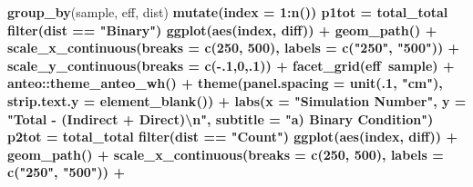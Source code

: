 \documentclass[]{DissertateUSU}
\newenvironment{Shaded}{\begin{snugshade}}{\end{snugshade}}
\newcommand{\KeywordTok}[1]{\textcolor[rgb]{0.13,0.29,0.53}{\textbf{#1}}}
\newcommand{\DataTypeTok}[1]{\textcolor[rgb]{0.13,0.29,0.53}{#1}}
\newcommand{\DecValTok}[1]{\textcolor[rgb]{0.00,0.00,0.81}{#1}}
\newcommand{\CharTok}[1]{\textcolor[rgb]{0.31,0.60,0.02}{#1}}
\newcommand{\StringTok}[1]{\textcolor[rgb]{0.31,0.60,0.02}{#1}}
\newcommand{\OperatorTok}[1]{\textcolor[rgb]{0.81,0.36,0.00}{\textbf{#1}}}
\newcommand{\NormalTok}[1]{#1}
\begin{document}
\begin{Shaded}
\begin{Highlighting}[]
{{{{{{{{{{\StringTok{  }\KeywordTok{group_by}\NormalTok{(sample, eff, dist) }\OperatorTok{%>%}
\StringTok{  }\KeywordTok{mutate}\NormalTok{(}\DataTypeTok{index =} \DecValTok{1}\OperatorTok{:}\KeywordTok{n}\NormalTok{())}
\NormalTok{p1tot =}\StringTok{ }\NormalTok{total_total }\OperatorTok{%>%}
\StringTok{  }\KeywordTok{filter}\NormalTok{(dist }\OperatorTok{==}\StringTok{ "Binary"}\NormalTok{) }\OperatorTok{%>%}
\StringTok{  }\KeywordTok{ggplot}\NormalTok{(}\KeywordTok{aes}\NormalTok{(index, diff)) }\OperatorTok{+}
\StringTok{    }\KeywordTok{geom_path}\NormalTok{() }\OperatorTok{+}
\StringTok{    }\KeywordTok{scale_x_continuous}\NormalTok{(}\DataTypeTok{breaks =} \KeywordTok{c}\NormalTok{(}\DecValTok{250}\NormalTok{, }\DecValTok{500}\NormalTok{),}
                       \DataTypeTok{labels =} \KeywordTok{c}\NormalTok{(}\StringTok{"250"}\NormalTok{, }\StringTok{"500"}\NormalTok{)) }\OperatorTok{+}
\StringTok{    }\KeywordTok{scale_y_continuous}\NormalTok{(}\DataTypeTok{breaks =} \KeywordTok{c}\NormalTok{(}\OperatorTok{-}\NormalTok{.}\DecValTok{1}\NormalTok{,}\DecValTok{0}\NormalTok{,.}\DecValTok{1}\NormalTok{)) }\OperatorTok{+}
\StringTok{    }\KeywordTok{facet_grid}\NormalTok{(eff}\OperatorTok{~}\NormalTok{sample) }\OperatorTok{+}
\StringTok{    }\NormalTok{anteo}\OperatorTok{::}\KeywordTok{theme_anteo_wh}\NormalTok{() }\OperatorTok{+}
\StringTok{    }\KeywordTok{theme}\NormalTok{(}\DataTypeTok{panel.spacing =} \KeywordTok{unit}\NormalTok{(.}\DecValTok{1}\NormalTok{, }\StringTok{"cm"}\NormalTok{),}
          \DataTypeTok{strip.text.y =} \KeywordTok{element_blank}\NormalTok{()) }\OperatorTok{+}
\StringTok{    }\KeywordTok{labs}\NormalTok{(}\DataTypeTok{x =} \StringTok{"Simulation Number"}\NormalTok{,}
         \DataTypeTok{y =} \StringTok{"Total - (Indirect + Direct)}\CharTok{\textbackslash{}n}\StringTok{"}\NormalTok{,}
         \DataTypeTok{subtitle =} \StringTok{"a) Binary Condition"}\NormalTok{)}
\NormalTok{p2tot =}\StringTok{ }\NormalTok{total_total }\OperatorTok{%>%}
\StringTok{  }\KeywordTok{filter}\NormalTok{(dist }\OperatorTok{==}\StringTok{ "Count"}\NormalTok{) }\OperatorTok{%>%}
\StringTok{  }\KeywordTok{ggplot}\NormalTok{(}\KeywordTok{aes}\NormalTok{(index, diff)) }\OperatorTok{+}
\StringTok{  }\KeywordTok{geom_path}\NormalTok{() }\OperatorTok{+}
\StringTok{  }\KeywordTok{scale_x_continuous}\NormalTok{(}\DataTypeTok{breaks =} \KeywordTok{c}\NormalTok{(}\DecValTok{250}\NormalTok{, }\DecValTok{500}\NormalTok{),}
                     \DataTypeTok{labels =} \KeywordTok{c}\NormalTok{(}\StringTok{"250"}\NormalTok{, }\StringTok{"500"}\NormalTok{)) }\OperatorTok{+}
}}}}}}}}}}}}}}}
\end{Highlighting}
\end{Shaded}
\end{document}
